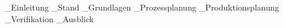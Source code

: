 \documentclass[
	ngerman,
	ruledheaders=section,%
	class=report,%
	thesis={type=bachelor},%
	accentcolor=1c,%
	custommargins=geometry,%
	marginpar=false,%
	parskip=half-,%
	fontsize=12pt,%
    IMRAD=false,
    pdfa=true,
    table,
    xcdraw,
]{tudapub}
\begin{document}
\clearpage                                                                                        %


{_Einleitung}                                                             %
{_Stand}                                                                  %
{_Grundlagen}                                                             %
{_Prozessplanung}                                                         %
{_Produktionsplanung}                                                     %
{_Verifikation}                                                           %
{_Ausblick}                                                               %
\clearpage                                                                                        %




\printbibliography                                                                                %
\end{document}

